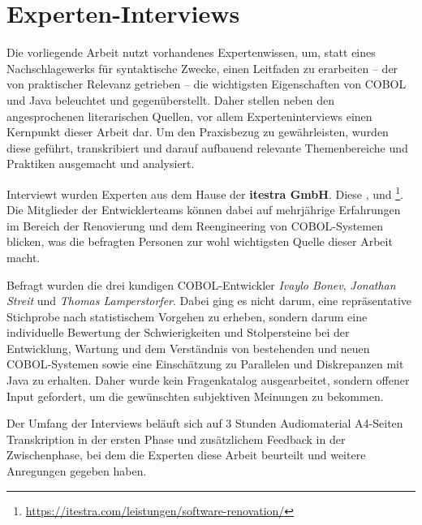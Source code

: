 \section{Experten-Interviews}
Die vorliegende Arbeit nutzt vorhandenes Expertenwissen, um, statt eines Nachschlagewerks für syntaktische Zwecke, einen Leitfaden zu erarbeiten -- der von praktischer Relevanz getrieben -- die wichtigsten Eigenschaften von COBOL und Java beleuchtet und gegenüberstellt. Daher stellen neben den angesprochenen literarischen Quellen, vor allem Experteninterviews einen Kernpunkt dieser Arbeit dar. Um den Praxisbezug zu gewährleisten, wurden diese geführt, transkribiert und darauf aufbauend relevante Themenbereiche und Praktiken ausgemacht und analysiert.

Interviewt wurden Experten aus dem Hause der \textbf{itestra GmbH}. Diese ,  und \footnote{\url{https://itestra.com/leistungen/software-renovation/} \visitedOn}. Die Mitglieder der Entwicklerteams können dabei auf mehrjährige Erfahrungen im Bereich der Renovierung und dem Reengineering von COBOL-Systemen blicken, was die befragten Personen zur wohl wichtigsten Quelle dieser Arbeit macht.

Befragt wurden die drei kundigen COBOL-Entwickler \textit{Ivaylo Bonev}, \textit{Jonathan Streit} und \textit{Thomas Lamperstorfer}. Dabei ging es nicht darum, eine repräsentative Stichprobe nach statistischem Vorgehen zu erheben, sondern darum eine individuelle Bewertung der Schwierigkeiten und Stolpersteine bei der Entwicklung, Wartung und dem Verständnis von bestehenden und neuen COBOL-Systemen sowie eine Einschätzung zu Parallelen und Diskrepanzen mit Java zu erhalten. Daher wurde kein Fragenkatalog ausgearbeitet, sondern offener Input gefordert, um die gewünschten subjektiven Meinungen zu bekommen. 

Der Umfang der Interviews beläuft sich auf 3 Stunden Audiomaterial  A4-Seiten Transkription in der ersten Phase und zusätzlichem Feedback in der Zwischenphase, bei dem die Experten diese Arbeit beurteilt und weitere Anregungen gegeben haben.